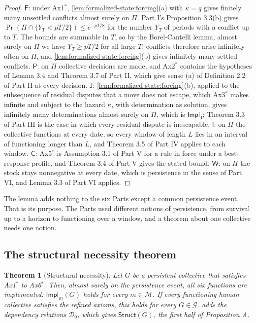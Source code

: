 \documentclass[11pt,letterpaper]{article}
\newtheorem{theorem}{Theorem}[section]
\theoremstyle{definition}
\theoremstyle{remark}
\newcommand{\pF}{\mathsf{F}}
\newcommand{\pP}{\mathsf{P}}
\newcommand{\pJ}{\mathsf{J}}
\newcommand{\pI}{\mathsf{I}}
\newcommand{\pC}{\mathsf{C}}
\newcommand{\pW}{\mathsf{W}}
\newcommand{\Mset}{\mathcal{M}}
\newcommand{\Struct}{\mathsf{Struct}}
\newcommand{\Impl}{\mathsf{Impl}}
\newcommand{\Dzero}{\mathcal{D}_0}
\begin{document}
\begin{proof}
$\pF$: under Ax1$^{*}$, \cref{lem:formalized-state:forcing}(a) with $\kappa=q$ gives finitely many unsettled conflicts almost surely on $\Pi$. Part I's Proposition 3.3(b) gives $\Pr(\Pi\cap\{Y_T<pT/2\})\le e^{-pT/8}$ for the number $Y_T$ of periods with a conflict up to $T$. The bounds are summable in $T$, so by the Borel-Cantelli lemma, almost surely on $\Pi$ we have $Y_T\ge pT/2$ for all large $T$; conflicts therefore arise infinitely often on $\Pi$, and \cref{lem:formalized-state:forcing}(b) gives infinitely many settled conflicts. $\pP$: on $\Pi$ collective decisions are made, and Ax2$^{*}$ contains the hypotheses of Lemma 3.4 and Theorem 3.7 of Part II, which give sense (a) of Definition 2.2 of Part II at every decision. $\pJ$: \cref{lem:formalized-state:forcing}(b), applied to the subsequence of residual disputes that a move does not escape, which Ax3$^{*}$ makes infinite and subject to the hazard $\kappa$, with determination as solution, gives infinitely many determinations almost surely on $\Pi$, which is $\Impl_{\pJ}$; Theorem 3.3 of Part III is the case in which every residual dispute is inescapable. $\pI$: on $\Pi$ the collective functions at every date, so every window of length $L$ lies in an interval of functioning longer than $L$, and Theorem 3.5 of Part IV applies to each window. $\pC$: Ax5$^{*}$ is Assumption 3.1 of Part V for a rule in force under a best-response profile, and Theorem 3.4 of Part V gives the stated bound. $\pW$: on $\Pi$ the stock stays nonnegative at every date, which is persistence in the sense of Part VI, and Lemma 3.3 of Part VI applies.
\end{proof}

The lemma adds nothing to the six Parts except a common persistence event. That is its purpose. The Parts used different notions of persistence, from survival up to a horizon to functioning over a window, and a theorem about one collective needs one notion.

\subsection{The structural necessity theorem}

\begin{theorem}[Structural necessity]
\label{thm:formalized-state:A}
Let $G$ be a persistent collective that satisfies Ax1$^{*}$ to Ax6$^{*}$. Then, almost surely on the persistence event, all six functions are implemented: $\Impl_m(G)$ holds for every $m\in\Mset$. If every functioning human collective satisfies the refined axioms, this holds for every $G\in\mathcal{G}$.  adds the dependency relations $\Dzero$, which gives $\Struct(G)$, the first half of Proposition A.
\end{theorem}
\end{document}
